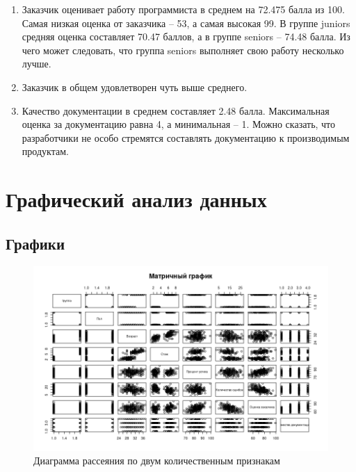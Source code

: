 \begin{enumerate}
	\item Заказчик оценивает работу программиста в среднем на 72.475 балла из 100. Самая низкая оценка от заказчика -- 53, а самая высокая 99. В группе juniors средняя оценка составляет 70.47 баллов, а в группе seniors -- 74.48 балла. Из чего может следовать, что группа seniors выполняет свою работу несколько лучше.
	
	\item Заказчик в общем удовлетворен чуть выше среднего.
	
	\item Качество документации в среднем составляет 2.48 балла. Максимальная оценка за документацию равна 4, а минимальная -- 1. Можно сказать, что разработчики не особо стремятся составлять документацию к производимым продуктам.
\end{enumerate}











\section{Графический анализ данных}

\subsection{Графики}

\begin{figure}[H]
	\centering
	\includegraphics[width=\linewidth]{fig1}
	\caption{Диаграмма рассеяния по двум количественным признакам}
\end{figure}

